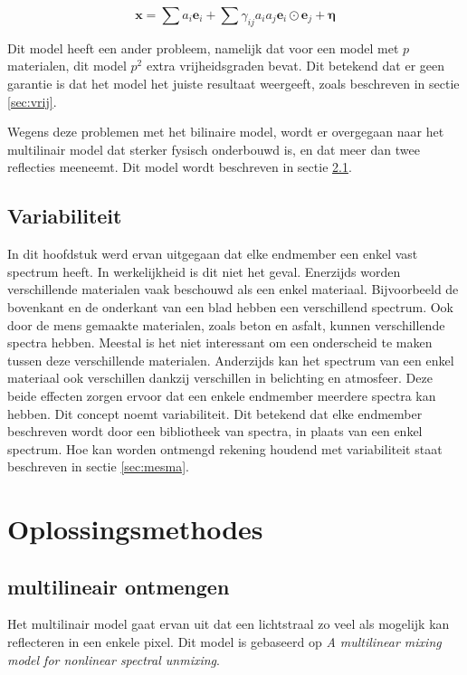 \documentclass[12pt]{report}
\begin{document}
\begin{equation}
\bm{x} = \sum a_i \bm{e}_i + \sum \gamma_{ij} a_i a_j \bm{e}_i \odot \bm{e}_j + \bm{\eta}
\end{equation}

Dit model heeft een ander probleem, namelijk dat voor een model met $p$ materialen, dit model $p^2$ extra vrijheidsgraden bevat. Dit betekend dat er geen garantie is dat het model het juiste resultaat weergeeft, zoals beschreven in sectie \ref{sec:vrij}. 

Wegens deze problemen met het bilinaire model, wordt er overgegaan naar het multilinair model dat sterker fysisch onderbouwd is, en dat meer dan twee reflecties meeneemt. Dit model wordt beschreven in sectie \ref{sec:multi}.

\section{Variabiliteit}\label{sec:select}

In dit hoofdstuk werd ervan uitgegaan dat elke endmember een enkel vast spectrum heeft. In werkelijkheid is dit niet het geval. Enerzijds worden verschillende materialen vaak beschouwd als een enkel materiaal. Bijvoorbeeld de bovenkant en de onderkant van een blad hebben een verschillend spectrum. Ook door de mens gemaakte materialen, zoals beton en asfalt, kunnen verschillende spectra hebben. Meestal is het niet interessant om een onderscheid te maken tussen deze verschillende materialen. Anderzijds kan het spectrum van een enkel materiaal ook verschillen dankzij verschillen in belichting en atmosfeer. Deze beide effecten zorgen ervoor dat een enkele endmember meerdere spectra kan hebben. Dit concept noemt variabiliteit. Dit betekend dat elke endmember beschreven wordt door een bibliotheek van spectra, in plaats van een enkel spectrum. Hoe kan worden ontmengd rekening houdend met variabiliteit staat beschreven in sectie \ref{sec:mesma}. 

\chapter{Oplossingsmethodes} 

\section{multilineair ontmengen} \label{sec:multi}

Het multilinair model gaat ervan uit dat een lichtstraal zo veel als mogelijk kan reflecteren in een enkele pixel. Dit model is gebaseerd op \textit{A multilinear mixing model for nonlinear spectral unmixing}\cite{mlinmix}. 
\end{document}
